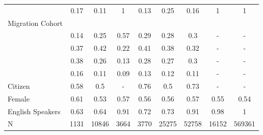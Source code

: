 \begin{table}[ht]
\begin{tabular}{>{\raggedright\arraybackslash}p{3.2cm}|cccccccc}
  \multicolumn{1}{>{\raggedleft\arraybackslash}p{2.9cm}|}{\makebox[2.9cm][r]{Greater than 50 }}& 0.17 & 0.11 & 1 & 0.13 & 0.25 & 0.16 & 1 & 1 \\ 
  Migration Cohort &  &  &  &  &  &  &  &  \\ 
  \multicolumn{1}{>{\raggedleft\arraybackslash}p{2.3cm}|}{\makebox[2.3cm][r]{Before 1965 }}& 0.14 & 0.25 & 0.57 & 0.29 & 0.28 & 0.3 & - & - \\ 
  \multicolumn{1}{>{\raggedleft\arraybackslash}p{2.2cm}|}{\makebox[2.2cm][r]{1965 - 1979 }}& 0.37 & 0.42 & 0.22 & 0.41 & 0.38 & 0.32 & - & - \\ 
  \multicolumn{1}{>{\raggedleft\arraybackslash}p{2.2cm}|}{\makebox[2.2cm][r]{1980 - 1999 }}& 0.38 & 0.26 & 0.13 & 0.28 & 0.27 & 0.3 & - & - \\ 
  \multicolumn{1}{>{\raggedleft\arraybackslash}p{2.1cm}|}{\makebox[2.1cm][r]{After 2000 }}& 0.16 & 0.11 & 0.09 & 0.13 & 0.12 & 0.11 & - & - \\ 
  Citizen & 0.58 & 0.5 & - & 0.76 & 0.5 & 0.73 & - & - \\ 
  Female & 0.61 & 0.53 & 0.57 & 0.56 & 0.56 & 0.57 & 0.55 & 0.54 \\ 
  English Speakers & 0.63 & 0.64 & 0.91 & 0.72 & 0.73 & 0.91 & 0.98 & 1 \\ 
  N & 1131 & 10846 & 3664 & 3770 & 25275 & 52758 & 16152 & 569361 \\ 
   \hline
\end{tabular}
\endgroup
\end{table}
